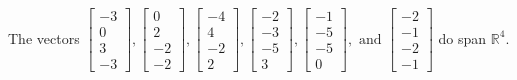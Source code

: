 \begin{exercise}
\begin{exerciseStatement}
  \end{exerciseStatement}
  \begin{exerciseAnswer}
   The vectors \(\left[\begin{array}{r}
-3 \\
0 \\
3 \\
-3
\end{array}\right] , \left[\begin{array}{r}
0 \\
2 \\
-2 \\
-2
\end{array}\right] , \left[\begin{array}{r}
-4 \\
4 \\
-2 \\
2
\end{array}\right] , \left[\begin{array}{r}
-2 \\
-3 \\
-5 \\
3
\end{array}\right] , \left[\begin{array}{r}
-1 \\
-5 \\
-5 \\
0
\end{array}\right] , \text{ and } \left[\begin{array}{r}
-2 \\
-1 \\
-2 \\
-1
\end{array}\right]\) 
  	 do  
	span \(\mathbb{R}^4\).
  


  \end{exerciseAnswer}
\end{exercise}
